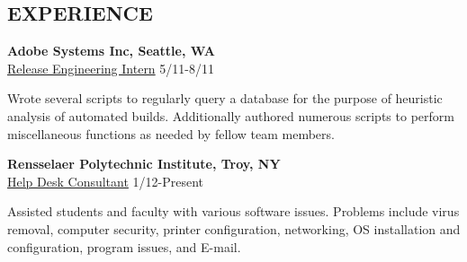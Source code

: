 \documentclass[margin,11pt]{res} %
\begin{document}
\begin{resume}
\section{EXPERIENCE}     {\bf Adobe Systems Inc, Seattle, WA}  \\
                  \underline{Release Engineering Intern} \hfill 5/11-8/11

              Wrote several scripts to regularly query a database for the purpose of heuristic analysis of automated builds. Additionally authored numerous scripts to perform miscellaneous functions as needed by fellow team members.      

                {\bf Rensselaer Polytechnic Institute, Troy, NY} \\
                  \underline{Help Desk Consultant} \hfill 1/12-Present

                Assisted students and faculty with various software issues. Problems include virus removal, computer security, printer configuration, networking, OS installation and configuration, program issues, and E-mail.
\end{resume} 
\end{document}
